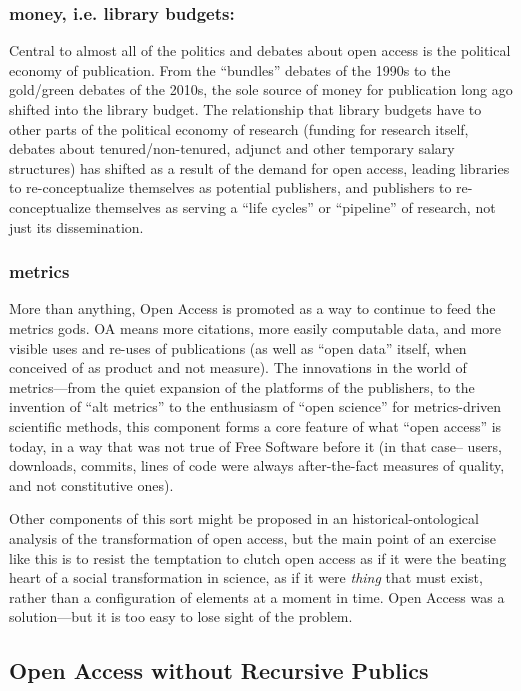 \documentclass[11pt]{article}
\begin{document}
\subsubsection*{\textbf{money, i.e. library budgets}:}
\label{sec:org457f93b}
Central to almost all of the politics and debates about open access is the political economy of publication.  From the ``bundles'' debates of the 1990s to the gold/green debates of the 2010s, the sole source of money for publication long ago shifted into the library budget. The relationship that library budgets have to other parts of the political economy of research (funding for research itself, debates about tenured/non-tenured, adjunct and other temporary salary structures) has shifted as a result of the demand for open access, leading libraries to re-conceptualize themselves as potential publishers, and publishers to re-conceptualize themselves as serving a ``life cycles'' or ``pipeline'' of research, not just its dissemination.

\subsubsection*{\textbf{metrics}}
\label{sec:orgce25cee}
More than anything, Open Access is promoted as a way to continue to feed the metrics gods.  OA means more citations, more easily computable data, and more visible uses and re-uses of publications (as well as ``open data'' itself, when conceived of as product and not measure).  The innovations in the world of metrics---from the quiet expansion of the platforms of the publishers, to the invention of ``alt metrics'' to the enthusiasm of ``open science'' for metrics-driven scientific methods, this component forms a core feature of what ``open access'' is today, in a way that was not true of Free Software before it (in that case-- users, downloads, commits, lines of code were always after-the-fact measures of quality, and not constitutive ones).  

Other components of this sort might be proposed in an historical-ontological analysis of the transformation of open access, but the main point of an exercise like this is to resist the temptation to clutch open access as if it were the beating heart of a social transformation in science, as if it were  \emph{thing} that must exist, rather than a configuration of elements at a moment in time.  Open Access was a solution---but it is too easy to lose sight of the problem. 

\subsection*{Open Access without Recursive Publics}
\label{sec:orgd9f242d}
\end{document}

